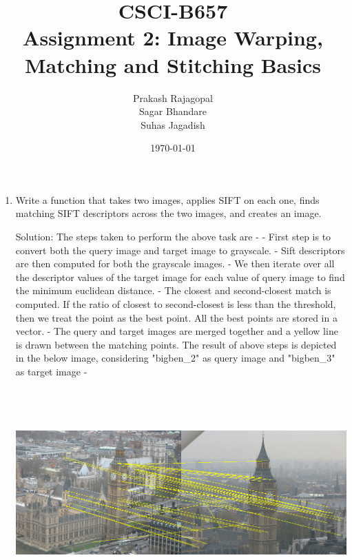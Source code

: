 \documentclass{article}
\begin{document}
\title{CSCI-B657 \\Assignment 2: Image Warping, Matching and Stitching Basics}         %
	\author{Prakash Rajagopal \\ Sagar Bhandare \\ Suhas Jagadish\\ }        %
	\date{\today}          %
	\maketitle
	
	\makeatother
	
	\pagestyle{plain}
	\begin{enumerate}
		\item Write a function that takes two images, applies SIFT on each one, finds matching SIFT descriptors across the two images, and creates an image. 
		
		Solution: The steps taken to perform the above task are - \newline
		- First step is to convert both the query image and target image to grayscale. \newline
		- Sift descriptors are then computed for both the grayscale images.\newline
		- We then iterate over all the descriptor values of the target image for each value of query image to find the minimum euclidean distance. \newline
		- The closest and second-closest match is computed. If the ratio of closest to second-closest is less than the threshold, then we treat the point as the best point. All the best points are stored in a vector. \newline
		- The query and target images are merged together and a yellow line is drawn between the matching points. \newline
		The result of above steps is depicted in the below image, considering "bigben\_2" as query image and "bigben\_3" as target image - 
		
		\begin{center}
			\includegraphics[width=16cm, height=8cm]{result_sift_match.jpg} \\
		\end{center}
		

\end{enumerate}
\end{document}

